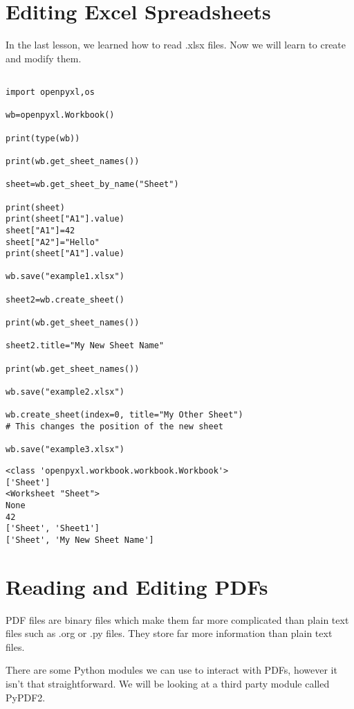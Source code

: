\documentclass[11pt]{article}
\begin{document}
\section{Editing Excel Spreadsheets}
\label{sec:org11159a3}

In the last lesson, we learned how to read .xlsx files. Now we will learn to create and modify them.

\begin{verbatim}

import openpyxl,os

wb=openpyxl.Workbook()

print(type(wb))

print(wb.get_sheet_names())

sheet=wb.get_sheet_by_name("Sheet")

print(sheet)
print(sheet["A1"].value)
sheet["A1"]=42
sheet["A2"]="Hello"
print(sheet["A1"].value)

wb.save("example1.xlsx")

sheet2=wb.create_sheet()

print(wb.get_sheet_names())

sheet2.title="My New Sheet Name"

print(wb.get_sheet_names())

wb.save("example2.xlsx")

wb.create_sheet(index=0, title="My Other Sheet")
# This changes the position of the new sheet

wb.save("example3.xlsx")

\end{verbatim}

\begin{verbatim}
<class 'openpyxl.workbook.workbook.Workbook'>
['Sheet']
<Worksheet "Sheet">
None
42
['Sheet', 'Sheet1']
['Sheet', 'My New Sheet Name']
\end{verbatim}

\section{Reading and Editing PDFs}
\label{sec:org6017e98}

PDF files are binary files which make them far more complicated than plain text files such as .org or .py files. They store far more information than plain text files.

There are some Python modules we can use to interact with PDFs, however it isn't that straightforward. We will be looking at a third party module called PyPDF2.
\end{document}
